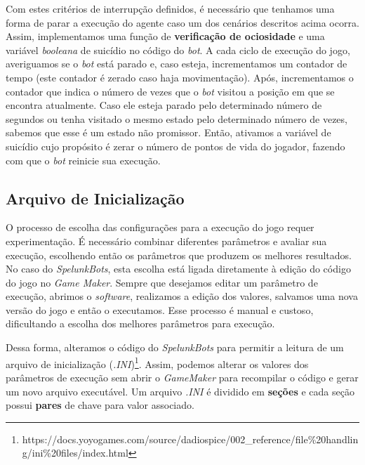 Com estes critérios de interrupção definidos, é necessário que tenhamos uma
forma de parar a execução do agente caso um dos cenários descritos acima ocorra.
Assim, implementamos uma função de \textbf{verificação de ociosidade} e uma
variável \textit{booleana} de suicídio no código do \textit{bot}. A cada ciclo
de execução do jogo, averiguamos se o \textit{bot} está parado e, caso esteja,
incrementamos um contador de tempo (este contador é zerado caso haja
movimentação). Após, incrementamos o contador que indica o número de vezes que o
\textit{bot} visitou a posição em que se encontra atualmente. Caso ele esteja
parado pelo determinado número de segundos ou tenha visitado o mesmo estado pelo
determinado número de vezes, sabemos que esse é um estado não promissor. Então,
ativamos a variável de suicídio cujo propósito é zerar o número de pontos de
vida do jogador, fazendo com que o \textit{bot} reinicie sua execução.

\subsection{Arquivo de Inicialização}

O processo de escolha das configurações para a execução do jogo requer
experimentação. É necessário combinar diferentes parâmetros e avaliar sua
execução, escolhendo então os parâmetros que produzem os melhores resultados.
No caso do \textit{SpelunkBots}, esta escolha está ligada diretamente à edição
do código do jogo no \textit{Game Maker}. Sempre que desejamos editar um
parâmetro de execução, abrimos o \textit{software}, realizamos a edição dos
valores, salvamos uma nova versão do jogo e então o executamos. Esse processo é
manual e custoso, dificultando a escolha dos melhores parâmetros para execução.  

Dessa forma, alteramos o código do \textit{SpelunkBots} para permitir a leitura
de um arquivo de inicialização
(\textit{.INI})\footnote{https://docs.yoyogames.com/source/dadiospice/002\_reference/file\%20handling/ini\%20files/index.html}.
Assim, podemos alterar os valores dos parâmetros de execução sem abrir o
\textit{GameMaker} para recompilar o código e gerar um novo arquivo executável.
Um arquivo \textit{.INI} é dividido em \textbf{seções} e cada seção possui
\textbf{pares} de chave para valor associado.

